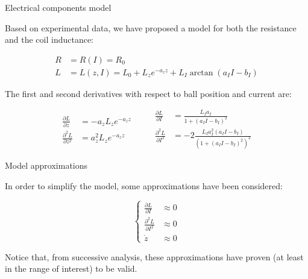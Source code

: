 \begin{frame}{Electrical components model}

    Based on experimental data, we have proposed a model for both the resistance and the coil inductance:

    \begin{equation}
        \begin{aligned}
            R & = R(I) = R_{0}                                                          \\
            L & = L(z, I) = L_{0} + L_{z} e^{-a_{z} z} + L_{I} \arctan(a_{I} I - b_{I})
        \end{aligned}
        \label{eq:model_for_inductance}
    \end{equation}

    The first and second derivatives with respect to ball position and current are:

    \begin{equation}
        \begin{aligned}
            \frac{\partial L}{\partial z}     & = -a_{z} L_{z} e^{-a_{z} z}  \\
            \frac{\partial^2 L}{\partial z^2} & = a_{z}^2 L_{z} e^{-a_{z} z}
        \end{aligned}
        \qquad
        \begin{aligned}
            \frac{\partial L}{\partial I}     & = \frac{L_{I} a_{I}}{1 + (a_{I} I - b_{I})^2}                            \\
            \frac{\partial^2 L}{\partial I^2} & = -2 \frac{L_{I} a_{I}^2 (a_{I} I - b_{I})}{(1 + (a_{I} I - b_{I})^2)^2}
        \end{aligned}
        \label{eq:model_for_inductance_derivatives}
    \end{equation}

\end{frame}



\begin{frame}{Model approximations}

    In order to simplify the model, some approximations have been considered:

    \begin{equation}
        \begin{cases}
            \frac{\partial L}{\partial I}     & \approx 0 \\
            \frac{\partial^2 L}{\partial I^2} & \approx 0 \\
            \dot{z}                           & \approx 0
        \end{cases}
        \label{eq:model_reduction_conditions}
    \end{equation}

    Notice that, from successive analysis, these approximations have proven (at least in the range of interest) to be valid.

\end{frame}



